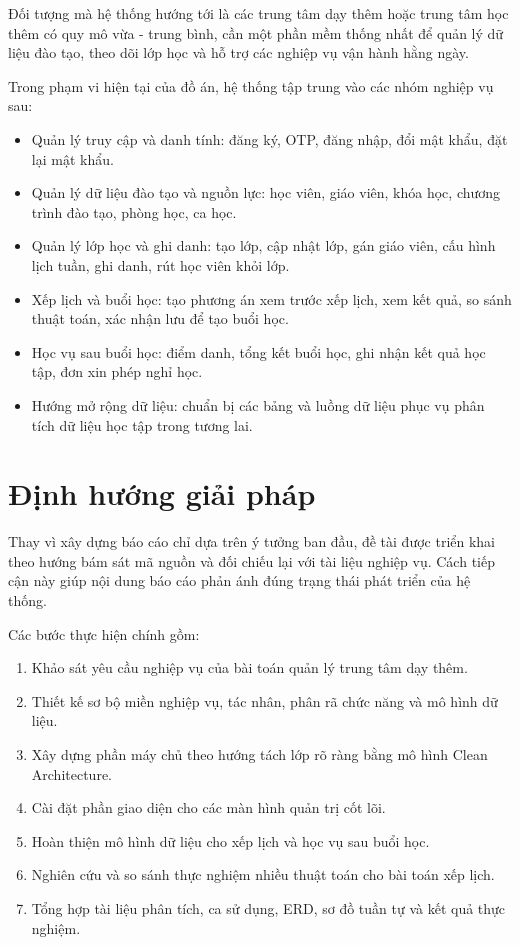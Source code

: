 \documentclass[../DoAn.tex]{subfiles}
\begin{document}
Đối tượng mà hệ thống hướng tới là các trung tâm dạy thêm hoặc trung tâm học thêm có quy mô vừa - trung bình, cần một phần mềm thống nhất để quản lý dữ liệu đào tạo, theo dõi lớp học và hỗ trợ các nghiệp vụ vận hành hằng ngày.

Trong phạm vi hiện tại của đồ án, hệ thống tập trung vào các nhóm nghiệp vụ sau:
\begin{itemize}
    \item Quản lý truy cập và danh tính: đăng ký, OTP, đăng nhập, đổi mật khẩu, đặt lại mật khẩu.
    \item Quản lý dữ liệu đào tạo và nguồn lực: học viên, giáo viên, khóa học, chương trình đào tạo, phòng học, ca học.
    \item Quản lý lớp học và ghi danh: tạo lớp, cập nhật lớp, gán giáo viên, cấu hình lịch tuần, ghi danh, rút học viên khỏi lớp.
    \item Xếp lịch và buổi học: tạo phương án xem trước xếp lịch, xem kết quả, so sánh thuật toán, xác nhận lưu để tạo buổi học.
    \item Học vụ sau buổi học: điểm danh, tổng kết buổi học, ghi nhận kết quả học tập, đơn xin phép nghỉ học.
    \item Hướng mở rộng dữ liệu: chuẩn bị các bảng và luồng dữ liệu phục vụ phân tích dữ liệu học tập trong tương lai.
\end{itemize}

\section{Định hướng giải pháp}
\label{section:1.3}
Thay vì xây dựng báo cáo chỉ dựa trên ý tưởng ban đầu, đề tài được triển khai theo hướng bám sát mã nguồn và đối chiếu lại với tài liệu nghiệp vụ. Cách tiếp cận này giúp nội dung báo cáo phản ánh đúng trạng thái phát triển của hệ thống.

Các bước thực hiện chính gồm:
\begin{enumerate}
    \item Khảo sát yêu cầu nghiệp vụ của bài toán quản lý trung tâm dạy thêm.
    \item Thiết kế sơ bộ miền nghiệp vụ, tác nhân, phân rã chức năng và mô hình dữ liệu.
    \item Xây dựng phần máy chủ theo hướng tách lớp rõ ràng bằng mô hình Clean Architecture.
    \item Cài đặt phần giao diện cho các màn hình quản trị cốt lõi.
    \item Hoàn thiện mô hình dữ liệu cho xếp lịch và học vụ sau buổi học.
    \item Nghiên cứu và so sánh thực nghiệm nhiều thuật toán cho bài toán xếp lịch.
    \item Tổng hợp tài liệu phân tích, ca sử dụng, ERD, sơ đồ tuần tự và kết quả thực nghiệm.
\end{enumerate}
\end{document}

